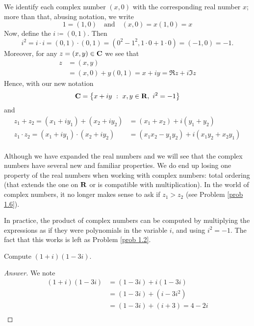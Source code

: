 \vspace*{1em}

\begin{discussion}
We identify each complex number $(x,0)$ with the corresponding real number $x$; more than that, abusing notation, we write
\[1 = (1,0)\quad \text{and} \quad (x,0) = x(1,0) = x\]
Now, define the  $i \coloneqq (0,1)$. Then
\[i^2 = i\cdot i = (0,1)\cdot (0,1) = (0^2 - 1^2,1\cdot 0 + 1\cdot 0) = (-1,0) = -1.\]
Moreover, for any $z = (x,y) \in \mathbf C$ we see that
\begin{align*}
z &= (x,y)\\[0.5em]
&= (x,0) + y(0,1) = x + iy = \Re z + i\Im z
\end{align*}
Hence, with our new notation
\[\mathbf C = \left\{x+iy\ :\ x,y\in \mathbf R,\ i^2 = -1\right\}\]
and
\begin{align*}
z_1 + z_2 = (x_1 + iy_1) + (x_2 + iy_2) &= (x_1 + x_2) + i(y_1 + y_2)\\[0.5em]
z_1 \cdot z_2 = (x_1 + iy_1) \cdot (x_2 + iy_2) &= (x_1x_2 - y_1y_2) + i(x_1y_2 + x_2y_1)
\end{align*}\\
Although we have expanded the real numbers and we will see that the complex numbers have several new and familiar properties. We do end up losing one property of the real numbers when working with complex numbers: total ordering (that extends the one on $\mathbf R$ or is compatible with multiplication). In the world of complex numbers, it no longer makes sense to ask if $z_1 > z_2$ (see Problem \ref{prob 1.6}).
\end{discussion}


In practice, the product of complex numbers can be computed by multiplying the expressions as if they were polynomials in the variable $i$, and using $i^2 = -1$. The fact that this works is left as Problem \ref{prob 1.2}.
\begin{example}
Compute $(1+i)(1-3i)$.
\end{example}
\begin{proof}[Answer]
We note
\begin{align*}
(1 + i)(1 - 3i) &= (1 - 3i) + i(1 - 3i)\\[0.5em]
&= (1 - 3i) + (i - 3i^2)\\[0.5em]
&= (1 - 3i) + (i + 3) = 4 - 2i\\[-2.5em]
\end{align*}
\end{proof}


